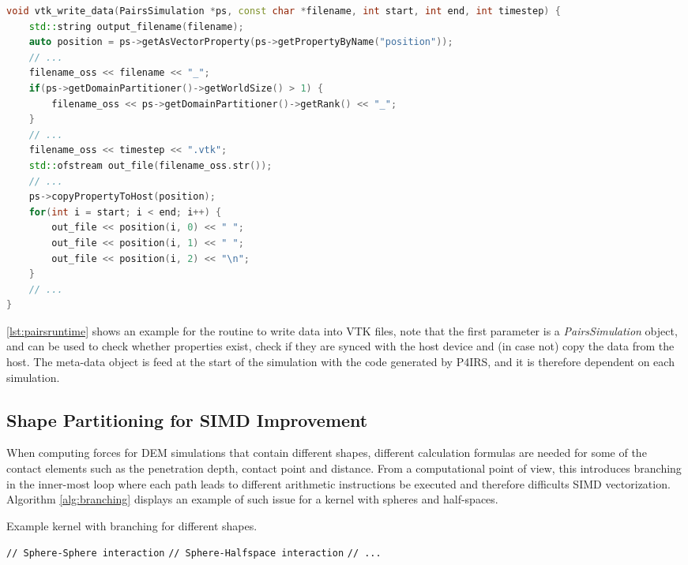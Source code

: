 \documentclass[preprint,12pt]{elsarticle}
\begin{document}
\begin{lstlisting}[language=C++,
		   label={lst:pairsruntime},
	   	   caption={P4IRS runtime routine example for writing VTK data into a file.}]
void vtk_write_data(PairsSimulation *ps, const char *filename, int start, int end, int timestep) {
    std::string output_filename(filename);
    auto position = ps->getAsVectorProperty(ps->getPropertyByName("position"));
    // ...
    filename_oss << filename << "_";
    if(ps->getDomainPartitioner()->getWorldSize() > 1) {
        filename_oss << ps->getDomainPartitioner()->getRank() << "_";
    }
    // ...
    filename_oss << timestep << ".vtk";
    std::ofstream out_file(filename_oss.str());
    // ...
    ps->copyPropertyToHost(position);
    for(int i = start; i < end; i++) {
        out_file << position(i, 0) << " ";
        out_file << position(i, 1) << " ";
        out_file << position(i, 2) << "\n";
    }
    // ...
}
\end{lstlisting}

\autoref{lst:pairsruntime} shows an example for the routine to write data into VTK files, note that the first parameter is a \emph{PairsSimulation} object, and can be used to check whether properties exist, check if they are synced with the host device and (in case not) copy the data from the host.
The meta-data object is feed at the start of the simulation with the code generated by P4IRS, and it is therefore dependent on each simulation.

\subsection{Shape Partitioning for SIMD Improvement}
\label{sec:shape_partitioning}

When computing forces for DEM simulations that contain different shapes, different calculation formulas are needed for some of the contact elements such as the penetration depth, contact point and distance.
From a computational point of view, this introduces branching in the inner-most loop where each path leads to different arithmetic instructions be executed and therefore difficults SIMD vectorization.
Algorithm \autoref{alg:branching} displays an example of such issue for a kernel with spheres and half-spaces.

\begin{algorithm}[H]
  \caption{Example kernel with branching for different shapes.}
  \label{alg:branching}
  \begin{algorithmic}[1]
          \State \texttt{// Sphere-Sphere interaction}
        \EndIf
          \State \texttt{// Sphere-Halfspace interaction}
        \EndIf
        \State \texttt{// ...}
      \EndFor
    \EndFor
  \end{algorithmic}
\end{algorithm}
\end{document}
